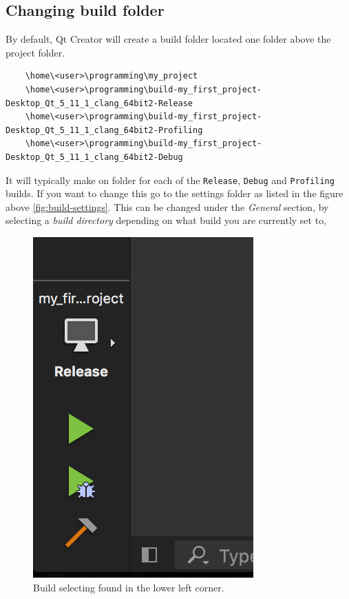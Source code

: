 \documentclass[11pt]{article}
\begin{document}
\subsection{Changing build folder}
By default, Qt Creator will create a build folder located one folder above the project folder.
\begin{lstlisting}
    \home\<user>\programming\my_project
    \home\<user>\programming\build-my_first_project-Desktop_Qt_5_11_1_clang_64bit2-Release
    \home\<user>\programming\build-my_first_project-Desktop_Qt_5_11_1_clang_64bit2-Profiling
    \home\<user>\programming\build-my_first_project-Desktop_Qt_5_11_1_clang_64bit2-Debug
\end{lstlisting}
It will typically make on folder for each of the \texttt{Release}, \texttt{Debug} and \texttt{Profiling} builds. If you want to change this go to the settings folder as listed in the figure above \ref{fig:build-settings}. This can be changed under the \textit{General} section, by selecting a \textit{build directory} depending on what build you are currently set to,
\begin{figure}[H]
    \centering
    \includegraphics[scale=0.4]{figures/changing_build_settings/build_select.png}
    \caption{Build selecting found in the lower left corner.}
    \label{fig:build-selection}
\end{figure}
\end{document}

